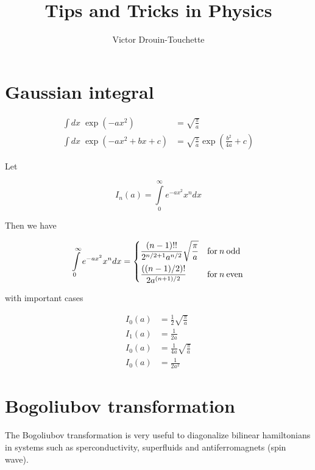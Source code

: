 \documentclass[11pt]{article} %
\title{Tips and Tricks in Physics}
\author{Victor Drouin-Touchette}
\newcommand{\1}{{\rm 1\hspace*{-0.38ex}%
\rule{0.1ex}{1.52ex}\hspace*{0.2ex}}}
\begin{document}
\maketitle


\tableofcontents

\section{Gaussian integral} \label{laplaceTrans}

\begin{align}
\int dx\; \exp{(-ax^2)}&= \sqrt{\frac{\pi}{a}} \\
\int dx\; \exp{(-ax^2+bx+c)}&= \sqrt{\frac{\pi}{a}} \exp{(\frac{b^2}{4a}+c)}
\end{align}

Let 

\begin{equation}
I_n (a) = \int\limits_0^{\infty} e^{-a x^2} x^n dx
\end{equation}

Then we have

\begin{equation}
\int\limits_0^{\infty} e^{-a x^2} x^n dx = \begin{dcases}
    \frac{(n-1)!!}{2^{n/2 +1} a^{n/2}} \sqrt{\frac{\pi}{a} }& \text{for} \: n \:\text{odd}\\        \frac{((n-1)/2)!}{2 a^{(n+1)/2}} & \text{for} \: n \: \text{even}       
\end{dcases}
\end{equation}

with important cases

\begin{align}
I_0(a) &= \frac{1}{2} \sqrt{\frac{\pi}{a}} \\
I_1(a) &= \frac{1}{2a}  \\
I_0(a) &= \frac{1}{4a} \sqrt{\frac{\pi}{a}} \\
I_0(a) &= \frac{1}{2a^2} 
\end{align}

\section{Bogoliubov transformation}

The Bogoliubov transformation is very useful to diagonalize bilinear hamiltonians in systems such as sperconductivity, superfluids and antiferromagnets (spin wave). 
\end{document}
